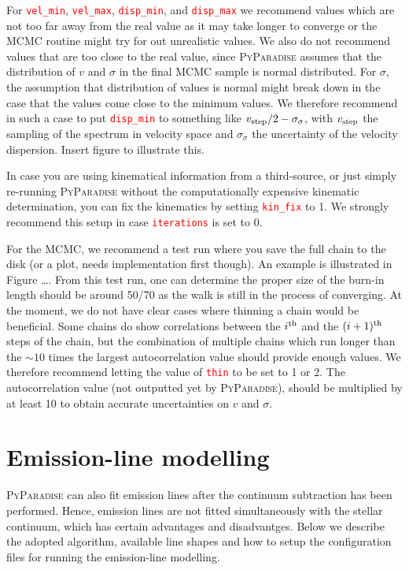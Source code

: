 \documentclass[usenatbib,usegraphicx,useAMS,onecolumn]{mn2e}
\newcommand{\codeline}[1]{\lstinline|#1|}
\newcommand{\paramdef}[1]{\textcolor{red}{\codeline{#1}}}
\begin{document}
For \paramdef{vel_min}, \paramdef{vel_max}, \paramdef{disp_min}, and \paramdef{disp_max} we recommend values which are not too far away from the real value as it may take longer to converge or the MCMC routine might try for out unrealistic values.
We also do not recommend values that are too close to the real value, since \textsc{PyParadise} assumes that the distribution of $v$ and $\sigma$ in the final MCMC sample is normal distributed.
For $\sigma$, the assumption that distribution of values is normal might break down in the case that the values come close to the minimum values.
We therefore recommend in such a case to put \paramdef{disp_min} to something like $v_{\rm step} / 2 - \sigma_{\sigma}$, with $v_{\rm step}$ the sampling of the spectrum in velocity space and $\sigma_{\sigma}$ the uncertainty of the velocity dispersion.
Insert figure to illustrate this.

In case you are using kinematical information from a third-source, or just simply re-running \textsc{PyParadise} without the computationally expensive kinematic determination, you can fix the kinematics by setting \paramdef{kin_fix} to 1.
We strongly recommend this setup in case \paramdef{iterations} is set to 0.

For the MCMC, we recommend a test run where you save the full chain to the disk (or a plot, needs implementation first though).
An example is illustrated in Figure \dots.
From this test run, one can determine the proper size of the burn-in length should be around 50/70 as the walk is still in the process of converging.
At the moment, we do not have clear cases where thinning a chain would be beneficial.
Some chains do show correlations between the $i^{\rm th}$ and the $(i + 1)^{\rm th}$ steps of the chain, but the combination of multiple chains which run longer than the $\sim 10$ times the largest autocorrelation value should provide enough values.
We therefore recommend letting the value of \paramdef{thin} to be set to 1 or 2.
The autocorrelation value (not outputted yet by \textsc{PyParadise}), should be multiplied by at least 10 to obtain accurate uncertainties on $v$ and $\sigma$.

\section{Emission-line modelling}\label{sec:em}
\textsc{PyParadise} can also fit emission lines after the continuum subtraction has been performed. Hence, emission lines are not fitted simultaneously with the stellar continuum, which has certain advantages and disadvantges. Below we describe the adopted algorithm, available line shapes and how to setup the configuration files for running the emission-line modelling. 
\end{document}
